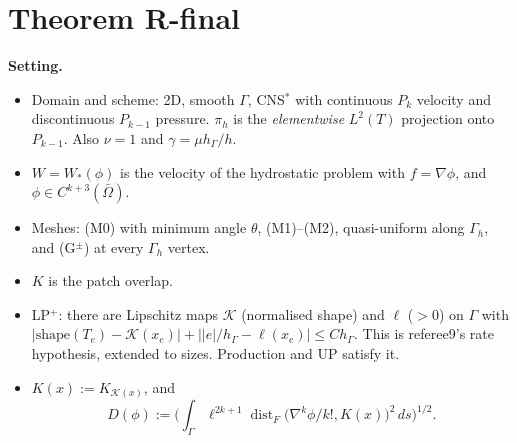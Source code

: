 \documentclass[11pt]{article}
\theoremstyle{remark}
\newcommand{\hG}{h_\Gamma}
\newcommand{\Gh}{\Gamma_h}
\begin{document}
\section{Theorem R-final}\label{sec:final}
\noindent\textbf{Setting.}
\begin{itemize}
\item Domain and scheme: 2D, smooth $\Gamma$, CNS$^\ast$ with continuous $P_k$ velocity and discontinuous $P_{k-1}$ pressure. $\pi_h$ is the
\emph{elementwise} $L^2(T)$ projection onto $P_{k-1}$. Also $\nu=1$ and $\gamma=\mu\hG/h$.
\item $W=W_\ast(\phi)$ is the velocity of the hydrostatic problem with $f=\nabla\phi$, and $\phi\in C^{k+3}(\bar\Omega)$.
\item Meshes: (M0) with minimum angle $\theta$, (M1)--(M2), quasi-uniform along $\Gh$, and (G$^\pm$) at every $\Gh$ vertex.
\item $K$ is the patch overlap.
\item LP$^+$: there are Lipschitz maps $\mathcal K$ (normalised shape) and $\ell$ ($>0$) on $\Gamma$ with
$|\mathrm{shape}(T_e)-\mathcal K(x_e)|+\big||e|/\hG-\ell(x_e)\big|\le C\hG$. This is referee9's rate hypothesis, extended to sizes. Production and
\textsf{UP} satisfy it.
\item $K(x):=K_{\mathcal K(x)}$, and
\[
D(\phi):=\Big(\int_\Gamma\ell^{2k+1}\operatorname{dist}_F\big(\nabla^k\phi/k!,K(x)\big)^2\,ds\Big)^{1/2}.
\]
\end{itemize}
\end{document}
